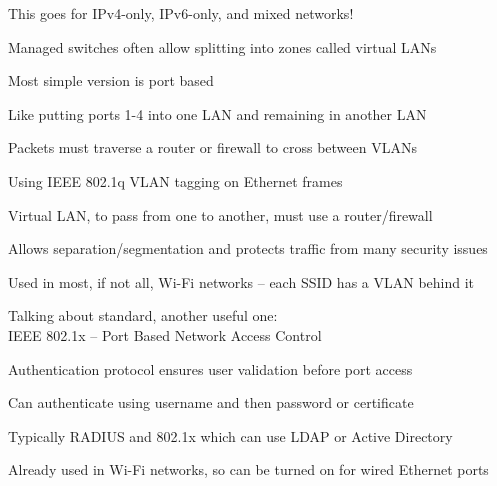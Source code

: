 \documentclass[Screen16to9,17pt]{foils}
\begin{document}
\centerline{This goes for IPv4-only, IPv6-only, and mixed networks!}




\begin{list1}
\item Managed switches often allow splitting into zones called virtual LANs
\item Most simple version is port based
\item Like putting ports 1-4 into one LAN and remaining in another LAN
\item Packets must traverse a router or firewall to cross between VLANs
\end{list1}



\begin{list1}
\item Using IEEE 802.1q  VLAN tagging on Ethernet frames
\item Virtual LAN, to pass from one to another, must use a router/firewall
\item Allows separation/segmentation and protects traffic from many security issues
\item Used in most, if not all, Wi-Fi networks -- each SSID has a VLAN behind it
\end{list1}





Talking about standard, another useful one:\\
IEEE 802.1x -- Port Based Network Access Control


\begin{list1}
\item Authentication protocol ensures user validation before port access
\item Can authenticate using username and then password or certificate
\item Typically RADIUS and 802.1x which can use LDAP or Active Directory
\item Already used in Wi-Fi networks, so can be turned on for wired Ethernet ports
\end{list1}
\end{document}
